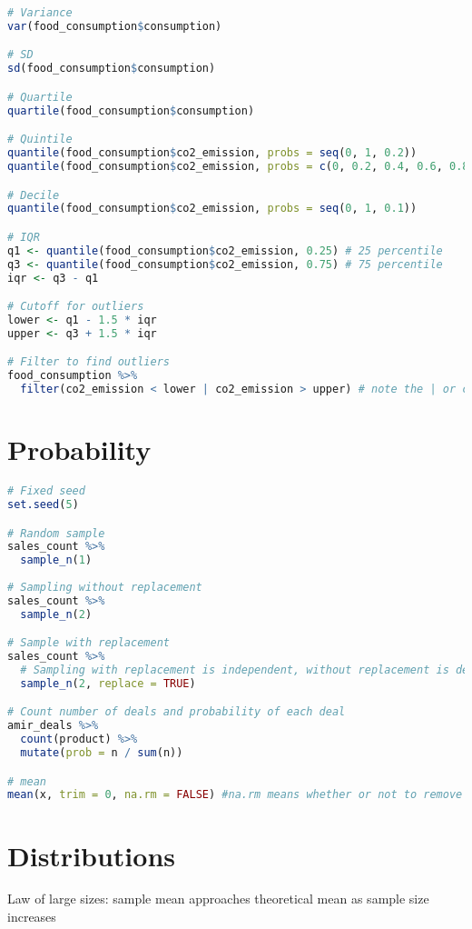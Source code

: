 \documentclass[11pt]{article}
\begin{document}
\begin{lstlisting}[language=R]
# Variance
var(food_consumption$consumption)

# SD
sd(food_consumption$consumption)

# Quartile
quartile(food_consumption$consumption)

# Quintile
quantile(food_consumption$co2_emission, probs = seq(0, 1, 0.2))
quantile(food_consumption$co2_emission, probs = c(0, 0.2, 0.4, 0.6, 0.8, 1.0))

# Decile
quantile(food_consumption$co2_emission, probs = seq(0, 1, 0.1))

# IQR
q1 <- quantile(food_consumption$co2_emission, 0.25) # 25 percentile
q3 <- quantile(food_consumption$co2_emission, 0.75) # 75 percentile
iqr <- q3 - q1

# Cutoff for outliers
lower <- q1 - 1.5 * iqr
upper <- q3 + 1.5 * iqr

# Filter to find outliers
food_consumption %>%
  filter(co2_emission < lower | co2_emission > upper) # note the | or condition instead of ,

\end{lstlisting}

\newpage
\section{Probability}

\begin{lstlisting}[language=R]
# Fixed seed
set.seed(5)

# Random sample
sales_count %>%
  sample_n(1)
  
# Sampling without replacement
sales_count %>%
  sample_n(2)

# Sample with replacement
sales_count %>%
  # Sampling with replacement is independent, without replacement is dependent
  sample_n(2, replace = TRUE)

# Count number of deals and probability of each deal
amir_deals %>%
  count(product) %>%
  mutate(prob = n / sum(n))

# mean
mean(x, trim = 0, na.rm = FALSE) #na.rm means whether or not to remove NA
\end{lstlisting}

\newpage
\section{Distributions}

Law of large sizes: sample mean approaches theoretical mean as sample size increases
\end{document}
